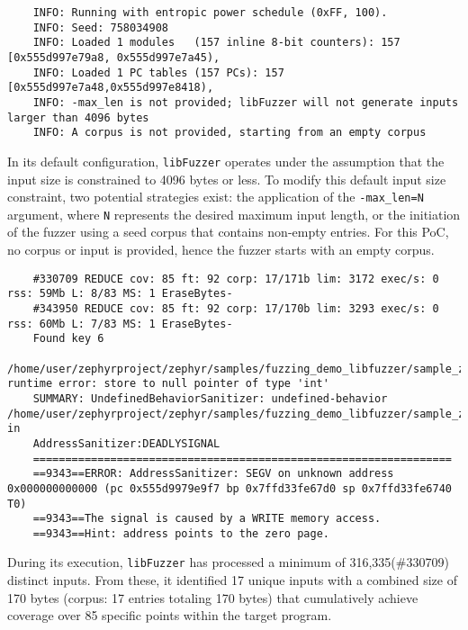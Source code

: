 \begin{verbatim}
    INFO: Running with entropic power schedule (0xFF, 100).
    INFO: Seed: 758034908
    INFO: Loaded 1 modules   (157 inline 8-bit counters): 157 [0x555d997e79a8, 0x555d997e7a45), 
    INFO: Loaded 1 PC tables (157 PCs): 157 [0x555d997e7a48,0x555d997e8418),
    INFO: -max_len is not provided; libFuzzer will not generate inputs larger than 4096 bytes
    INFO: A corpus is not provided, starting from an empty corpus
\end{verbatim}

In its default configuration, \texttt{libFuzzer} operates under
the assumption that the input size is constrained to 4096 bytes or less.
To modify this default input size constraint, two potential strategies exist:
the application of the \texttt{-max\_len=N} argument, where \texttt{N} represents
the desired maximum input length, or the initiation of the fuzzer using a
seed corpus that contains non-empty entries. For this PoC, no corpus or input
is provided, hence the fuzzer starts with an empty corpus.

\begin{verbatim}
    #330709 REDUCE cov: 85 ft: 92 corp: 17/171b lim: 3172 exec/s: 0 rss: 59Mb L: 8/83 MS: 1 EraseBytes-
    #343950 REDUCE cov: 85 ft: 92 corp: 17/170b lim: 3293 exec/s: 0 rss: 60Mb L: 7/83 MS: 1 EraseBytes-
    Found key 6
    /home/user/zephyrproject/zephyr/samples/fuzzing_demo_libfuzzer/sample_zephyr_libfuzzer/src/main.c:52:1: runtime error: store to null pointer of type 'int'
    SUMMARY: UndefinedBehaviorSanitizer: undefined-behavior /home/user/zephyrproject/zephyr/samples/fuzzing_demo_libfuzzer/sample_zephyr_libfuzzer/src/main.c:52:1 in
    AddressSanitizer:DEADLYSIGNAL
    =================================================================
    ==9343==ERROR: AddressSanitizer: SEGV on unknown address 0x000000000000 (pc 0x555d9979e9f7 bp 0x7ffd33fe67d0 sp 0x7ffd33fe6740 T0)
    ==9343==The signal is caused by a WRITE memory access.
    ==9343==Hint: address points to the zero page.
\end{verbatim}

During its execution, \texttt{libFuzzer} has processed a minimum of
316,335(\#330709) distinct inputs. From these, it identified 17 unique
inputs with a combined size of 170 bytes (corpus: 17 entries totaling 170 bytes)
that cumulatively achieve coverage over 85 specific points within the target program.

